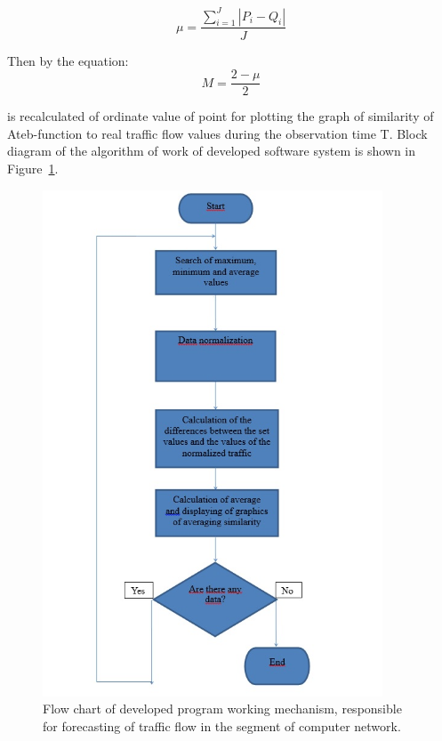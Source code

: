 \documentclass[runningheads,a4paper]{llncs}
\begin{document}
\begin{equation}
\mu = \frac{\sum_{i=1}^{J}|P_i - Q_i|}{J}
\end{equation}

Then by the equation:
\begin{equation}
M = \frac{2-\mu}{2}
\end{equation}

is recalculated of ordinate value of point for plotting the graph of similarity of Ateb-function  to real traffic flow values during the observation time T. Block diagram of the algorithm of work of developed software system is shown in Figure~\ref{fig:2}.

\begin{figure}
\centering
\includegraphics[height=0.9\textheight, width=0.9\textwidth]{fig2}
\caption{Flow chart of developed program working mechanism, responsible for forecasting of traffic flow in the segment of computer network.}
\label{fig:2}
\end{figure}
\end{document}
